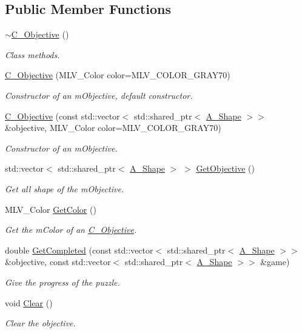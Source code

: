\subsection*{Public Member Functions}
\begin{DoxyCompactItemize}
\item 
\hyperlink{classC__Objective_a4e05cb06acbee6d49734e2696cd419e9}{$\sim$\+C\+\_\+\+Objective} ()
\begin{DoxyCompactList}\small\item\em Class methods. \end{DoxyCompactList}\item 
\hyperlink{classC__Objective_aedbb7d27ece1f7894285398ae79ea588}{C\+\_\+\+Objective} (M\+L\+V\+\_\+\+Color color=M\+L\+V\+\_\+\+C\+O\+L\+O\+R\+\_\+\+G\+R\+A\+Y70)
\begin{DoxyCompactList}\small\item\em Constructor of an m\+Objective, default constructor. \end{DoxyCompactList}\item 
\hyperlink{classC__Objective_ae92eb6210a460fa7b551651584790ac8}{C\+\_\+\+Objective} (const std\+::vector$<$ std\+::shared\+\_\+ptr$<$ \hyperlink{classA__Shape}{A\+\_\+\+Shape} $>$$>$ \&objective, M\+L\+V\+\_\+\+Color color=M\+L\+V\+\_\+\+C\+O\+L\+O\+R\+\_\+\+G\+R\+A\+Y70)
\begin{DoxyCompactList}\small\item\em Constructor of an m\+Objective. \end{DoxyCompactList}\item 
std\+::vector$<$ std\+::shared\+\_\+ptr$<$ \hyperlink{classA__Shape}{A\+\_\+\+Shape} $>$ $>$ \hyperlink{classC__Objective_aa8e3dea19bd4578246b183d2bad2d475}{Get\+Objective} ()
\begin{DoxyCompactList}\small\item\em Get all shape of the m\+Objective. \end{DoxyCompactList}\item 
M\+L\+V\+\_\+\+Color \hyperlink{classC__Objective_aeaaa69ca15b1e1d8edbc3f1920399964}{Get\+Color} ()
\begin{DoxyCompactList}\small\item\em Get the m\+Color of an \hyperlink{classC__Objective}{C\+\_\+\+Objective}. \end{DoxyCompactList}\item 
double \hyperlink{classC__Objective_a026149982f0d62ea0a039a8b94bbaae0}{Get\+Completed} (const std\+::vector$<$ std\+::shared\+\_\+ptr$<$ \hyperlink{classA__Shape}{A\+\_\+\+Shape} $>$$>$ \&objective, const std\+::vector$<$ std\+::shared\+\_\+ptr$<$ \hyperlink{classA__Shape}{A\+\_\+\+Shape} $>$$>$ \&game)
\begin{DoxyCompactList}\small\item\em Give the progress of the puzzle. \end{DoxyCompactList}\item 
void \hyperlink{classC__Objective_a05924ace1e7f1c2f04de7f6c007cb104}{Clear} ()
\begin{DoxyCompactList}\small\item\em Clear the objective. \end{DoxyCompactList}\end{DoxyCompactItemize}
